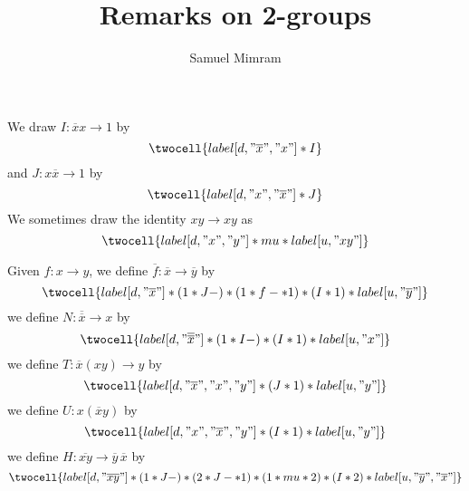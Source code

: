 \documentclass[a4paper]{article}
\title{Remarks on 2-groups}
\author{Samuel Mimram}
\newcommand{\ol}{\overline}
\begin{document}
\maketitle

We draw $I:\ol xx\to 1$ by
\[
  \twocell{label[d,"\ol x","x"] * I}
\]
and $J:x\ol x\to 1$ by
\[
  \twocell{label[d,"x","\ol x"] * J}
\]
We sometimes draw the identity $xy\to xy$ as
\[
  \twocell{label[d,"x","y"]*mu*label[u,"xy"]}
\]

\noindent
Given $f:x\to y$, we define $\ol f:\ol x\to\ol y$ by
\[
  \twocell{label[d,"\ol x"]*(1*J-)*(1*f-*1)*(I*1)*label[u,"\ol y"]}
\]
we define $N:\ol{\ol x}\to x$ by
\[
  \twocell{label[d,"\ol{\ol x}"]*(1*I-)*(I*1)*label[u,"x"]}
\]
we define $T:\ol x(xy)\to y$ by
\[
  \twocell{label[d,"\ol x","x","y"]*(J*1)*label[u,"y"]}
\]
we define $U:x(\ol xy)$ by
\[
  \twocell{label[d,"x","\ol x","y"]*(I*1)*label[u,"y"]}
\]
we define $H:\ol{xy}\to\ol y\,\ol x$ by
\[
  \twocell{label[d,"\ol{xy}"]*(1*J-)*(2*J-*1)*(1*mu*2)*(I*2)*label[u,"\ol y","\ol x"]}
\]
\end{document}
